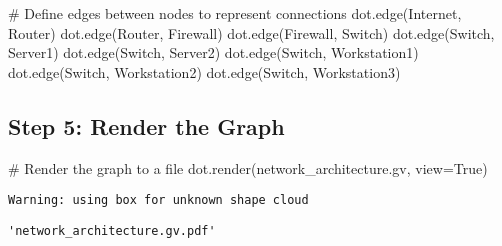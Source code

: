 \documentclass[
  letterpaper,
  DIV=11,
  numbers=noendperiod]{scrreprt}
\newenvironment{Shaded}{\begin{snugshade}}{\end{snugshade}}
\newcommand{\CommentTok}[1]{\textcolor[rgb]{0.37,0.37,0.37}{#1}}
\newcommand{\NormalTok}[1]{\textcolor[rgb]{0.00,0.23,0.31}{#1}}
\newcommand{\OperatorTok}[1]{\textcolor[rgb]{0.37,0.37,0.37}{#1}}
\newcommand{\StringTok}[1]{\textcolor[rgb]{0.13,0.47,0.30}{#1}}
\newcommand{\VariableTok}[1]{\textcolor[rgb]{0.07,0.07,0.07}{#1}}
\begin{document}
\begin{Shaded}
\begin{Highlighting}[]
\CommentTok{\# Define edges between nodes to represent connections}
\NormalTok{dot.edge(}\StringTok{\textquotesingle{}Internet\textquotesingle{}}\NormalTok{, }\StringTok{\textquotesingle{}Router\textquotesingle{}}\NormalTok{)}
\NormalTok{dot.edge(}\StringTok{\textquotesingle{}Router\textquotesingle{}}\NormalTok{, }\StringTok{\textquotesingle{}Firewall\textquotesingle{}}\NormalTok{)}
\NormalTok{dot.edge(}\StringTok{\textquotesingle{}Firewall\textquotesingle{}}\NormalTok{, }\StringTok{\textquotesingle{}Switch\textquotesingle{}}\NormalTok{)}
\NormalTok{dot.edge(}\StringTok{\textquotesingle{}Switch\textquotesingle{}}\NormalTok{, }\StringTok{\textquotesingle{}Server1\textquotesingle{}}\NormalTok{)}
\NormalTok{dot.edge(}\StringTok{\textquotesingle{}Switch\textquotesingle{}}\NormalTok{, }\StringTok{\textquotesingle{}Server2\textquotesingle{}}\NormalTok{)}
\NormalTok{dot.edge(}\StringTok{\textquotesingle{}Switch\textquotesingle{}}\NormalTok{, }\StringTok{\textquotesingle{}Workstation1\textquotesingle{}}\NormalTok{)}
\NormalTok{dot.edge(}\StringTok{\textquotesingle{}Switch\textquotesingle{}}\NormalTok{, }\StringTok{\textquotesingle{}Workstation2\textquotesingle{}}\NormalTok{)}
\NormalTok{dot.edge(}\StringTok{\textquotesingle{}Switch\textquotesingle{}}\NormalTok{, }\StringTok{\textquotesingle{}Workstation3\textquotesingle{}}\NormalTok{)}
\end{Highlighting}
\end{Shaded}

\subsection{Step 5: Render the Graph}\label{step-5-render-the-graph}

\begin{Shaded}
\begin{Highlighting}[]
\CommentTok{\# Render the graph to a file}
\NormalTok{dot.render(}\StringTok{\textquotesingle{}network\_architecture.gv\textquotesingle{}}\NormalTok{, view}\OperatorTok{=}\VariableTok{True}\NormalTok{)}
\end{Highlighting}
\end{Shaded}

\begin{verbatim}
Warning: using box for unknown shape cloud
\end{verbatim}

\begin{verbatim}
'network_architecture.gv.pdf'
\end{verbatim}
\end{document}
